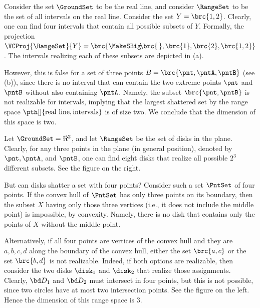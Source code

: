 Consider the set $\GroundSet$ to be the real line, and consider
$\RangeSet$ to be the set of all intervals on the real line.
Consider the set $Y = \brc{1,2}$.  Clearly, one can find four
intervals that contain all possible subsets of $Y$.  Formally, the
projection
$\VCProj{\RangeSet}{Y} = \brc{ \MakeSBig\! \brc{\,}, \brc{ 1 },
   \brc{2}, \brc{1,2} }$. The intervals realizing each of these
subsets are depicted in  (a).

However, this is false for a set of three
points $B = \brc{\pnt,\pntA,\pntB}$ (see  (b)),
since there is no interval that
can contain the two extreme points $\pnt$ and $\pntB$ without also
containing $\pntA$. Namely, the subset $\brc{\pnt,\pntB}$ is not
realizable for intervals, implying that the largest shattered set by
the range space $\pth[]{\text{real line}, \text{intervals} }$ is of
size two. We conclude that the \VC dimension of this space is two.


\medskip%
\noindent%
\begin{minipage}{0.76\linewidth}
    Let $\GroundSet = \Re^2$, and let $\RangeSet$ be the set of disks
    in the plane. Clearly, for any three points in the plane (in
    general position), denoted by $\pnt, \pntA$, and $\pntB$, one can
    find eight disks that realize all possible $2^3$ different
    subsets.  See the figure on the right.

    But can disks shatter a set with four points? Consider such a set
    $\PntSet$ of four points. If the convex hull of $\PntSet$ has only
    three points on its boundary, then the subset $X$ having only
    those three vertices (i.e., it does not include the middle point)
    is impossible, by convexity. Namely, there is no disk that
    contains only the points of $X$ without the middle point.
\end{minipage}%
\hfill%
\begin{minipage}{0.22\linewidth}
    \hfill%
\end{minipage}



\medskip%
\noindent%
\begin{minipage}{0.76\linewidth}
    Alternatively, if all four points are vertices of the convex hull
    and they are $a,b,c,d$ along the boundary of the convex hull,
    either the set $\brc{a, c}$ or the set $\brc{b, d}$ is not
    realizable. Indeed, if both options are realizable, then consider
    the two disks $\disk_1$ and $\disk_2$ that realize those
    assignments.  Clearly, $\bd D_1$ and $\bd D_2$ must intersect in
    four points, but this is not possible, since two circles have at
    most two intersection points. See the figure on the left.  Hence
    the \VC dimension of this range space is $3$.
\end{minipage}
\begin{minipage}{0.22\linewidth}
    \hfill%
\end{minipage}


